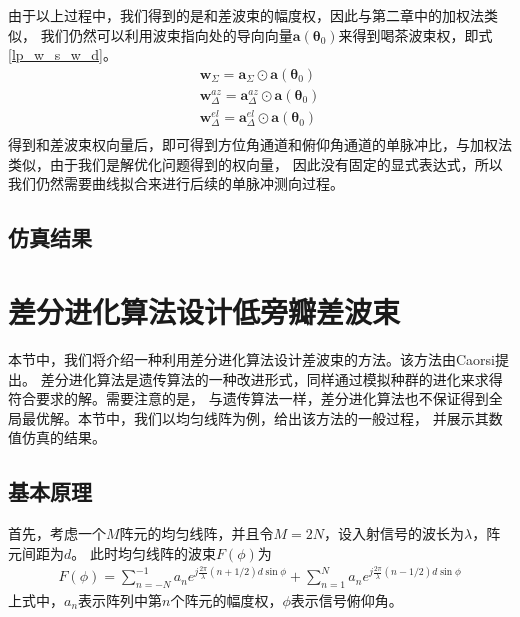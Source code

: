 \documentclass[master]{thesis-uestc}
\begin{document}
由于以上过程中，我们得到的是和差波束的幅度权，因此与第二章中的加权法类似，
我们仍然可以利用波束指向处的导向向量$\bm{a}(\bm{\theta}_0)$来得到喝茶波束权，即式\eqref{lp_w_s_w_d}。
\begin{subequations}\label{lp_w_s_w_d}
    \begin{align}
        \bm{w}_\Sigma = \bm{a}_\Sigma \odot \bm{a}(\bm{\theta}_0) \\
        \bm{w}_\Delta^{az} = \bm{a}_\Delta^{az} \odot \bm{a}(\bm{\theta}_0) \\
        \bm{w}_\Delta^{el} = \bm{a}_\Delta^{el} \odot \bm{a}(\bm{\theta}_0) \\
    \end{align}
\end{subequations}
得到和差波束权向量后，即可得到方位角通道和俯仰角通道的单脉冲比，与加权法类似，由于我们是解优化问题得到的权向量，
因此没有固定的显式表达式，所以我们仍然需要曲线拟合来进行后续的单脉冲测向过程。

\subsection{仿真结果}

\section{差分进化算法设计低旁瓣差波束}
本节中，我们将介绍一种利用差分进化算法设计差波束的方法。该方法由Caorsi提出\cite{Caorsi}。
差分进化算法是遗传算法的一种改进形式，同样通过模拟种群的进化来求得符合要求的解。需要注意的是，
与遗传算法一样，差分进化算法也不保证得到全局最优解。本节中，我们以均匀线阵为例，给出该方法的一般过程，
并展示其数值仿真的结果。

\subsection{基本原理}
首先，考虑一个$M$阵元的均匀线阵，并且令$M=2N$，设入射信号的波长为$\lambda$，阵元间距为$d$。
此时均匀线阵的波束$F(\phi)$为
\begin{equation}\label{de_pattern_fromula}
    \begin{aligned}
        F(\phi) = \sum_{n=-N}^{-1}a_ne^{j\frac{2\pi}{\lambda}\left(n+1/2\right)d\sin\phi} +
        \sum_{n=1}^{N}a_ne^{j\frac{2\pi}{\lambda}\left(n-1/2\right)d\sin\phi}
    \end{aligned}
\end{equation}
上式中，$a_n$表示阵列中第$n$个阵元的幅度权，$\phi$表示信号俯仰角。
\end{document}
